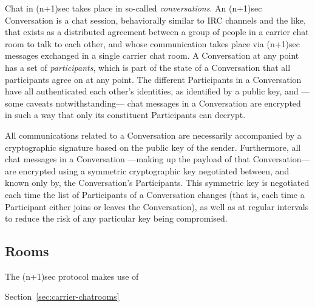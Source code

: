 \documentclass{article}
\begin{document}
Chat in (n+1)sec takes place in so-called \emph{conversations}.
An (n+1)sec Conversation is a chat session, behaviorally similar to IRC channels and the like, that exists as a distributed agreement between a group of people in a carrier chat room to talk to each other, and whose communication takes place via (n+1)sec messages exchanged in a single carrier chat room.
A Conversation at any point has a set of \emph{participants}, which is part of the state of a Conversation that all participants agree on at any point.
The different Participants in a Conversation have all authenticated each other's identities, as identified by a public key, and ---some caveats notwithstanding--- chat messages in a Conversation are encrypted in such a way that only its constituent Participants can decrypt.

All communications related to a Conversation are necessarily accompanied by a cryptographic signature based on the public key of the sender.
Furthermore, all chat messages in a Conversation ---making up the payload of that Conversation--- are encrypted using a symmetric cryptographic key negotiated between, and known only by, the Conversation's Participants.
This symmetric key is negotiated each time the list of Participants of a Conversation changes (that is, each time a Participant either joins or leaves the Conversation), as well as at regular intervals to reduce the risk of any particular key being compromised.

\subsection{Rooms}
The (n+1)sec protocol makes use of 

Section~\ref{sec:carrier-chatrooms}


\end{document}
